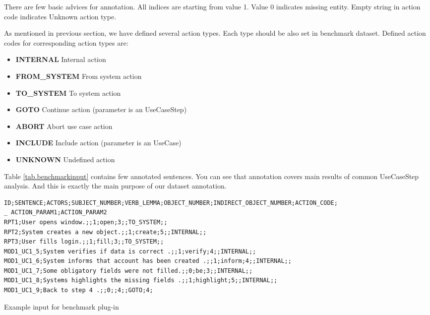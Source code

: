 There are few basic advices for annotation. All indices are starting from value 1. Value 0 indicates missing entity. Empty string in action code indicates Unknown action type. 

As mentioned in previous section, we have defined several action types. Each type should be also set in benchmark dataset. Defined action codes for corresponding action types are:      
     
\begin{itemize}
\item {\bf INTERNAL} Internal action
\item {\bf FROM\_SYSTEM} From system action
\item {\bf TO\_SYSTEM} To system action
\item {\bf GOTO} Continue action (parameter is an UseCaseStep)
\item {\bf ABORT} Abort use case action
\item {\bf INCLUDE} Include action (parameter is an UseCase)
\item {\bf UNKNOWN} Undefined action
\end{itemize}     

Table \ref{tab.benchmarkinput} contains few annotated sentences. You can see that annotation covers main results of common UseCaseStep analysis. And this is exactly the main purpose of our dataset annotation.
      
\begin{table}[ht]   %
\begin{center}
    \begin{scriptsize}  
    \begin{verbatim}      
ID;SENTENCE;ACTORS;SUBJECT_NUMBER;VERB_LEMMA;OBJECT_NUMBER;INDIRECT_OBJECT_NUMBER;ACTION_CODE;
_ ACTION_PARAM1;ACTION_PARAM2
RPT1;User opens window.;;1;open;3;;TO_SYSTEM;;
RPT2;System creates a new object.;;1;create;5;;INTERNAL;;
RPT3;User fills login.;;1;fill;3;;TO_SYSTEM;;
MOD1_UC1_5;System verifies if data is correct .;;1;verify;4;;INTERNAL;;
MOD1_UC1_6;System informs that account has been created .;;1;inform;4;;INTERNAL;;
MOD1_UC1_7;Some obligatory fields were not filled.;;0;be;3;;INTERNAL;;
MOD1_UC1_8;Systems highlights the missing fields .;;1;highlight;5;;INTERNAL;;
MOD1_UC1_9;Back to step 4 .;;0;;4;;GOTO;4;
    \end{verbatim}
    \end{scriptsize}
  \caption{Example input for benchmark plug-in}
  \label{tab.benchmarkinput}
\end{center}
\end{table}      
      
